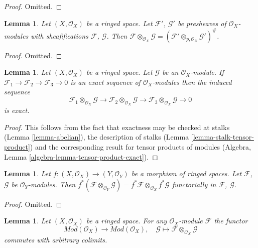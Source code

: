 \documentclass{stacks-project}
\theoremstyle{plain}
\newtheorem{lemma}[subsection]{Lemma}
\theoremstyle{definition}
\theoremstyle{remark}
\numberwithin{equation}{subsection}
\begin{document}
\begin{proof}
Omitted.
\end{proof}

\begin{lemma}
\label{lemma-tensor-product-sheafification}
Let $(X, \mathcal{O}_X)$ be a ringed space.
Let $\mathcal{F}'$, $\mathcal{G}'$ be presheaves of $\mathcal{O}_X$-modules
with sheafifications $\mathcal{F}$, $\mathcal{G}$. Then
$\mathcal{F} \otimes_{\mathcal{O}_X} \mathcal{G} =
(\mathcal{F}' \otimes_{p, \mathcal{O}_X} \mathcal{G}')^\#$.
\end{lemma}

\begin{proof}
Omitted.
\end{proof}


\begin{lemma}
\label{lemma-tensor-product-exact}
Let $(X, \mathcal{O}_X)$ be a ringed space.
Let $\mathcal{G}$ be an $\mathcal{O}_X$-module.
If
$\mathcal{F}_1
\to \mathcal{F}_2
\to \mathcal{F}_3
\to 0$
is an exact sequence of $\mathcal{O}_X$-modules then
the induced sequence
$$
\mathcal{F}_1 \otimes_{\mathcal{O}_X} \mathcal{G} \to
\mathcal{F}_2 \otimes_{\mathcal{O}_X} \mathcal{G} \to
\mathcal{F}_3 \otimes_{\mathcal{O}_X} \mathcal{G} \to
0
$$
is exact.
\end{lemma}

\begin{proof}
This follows from the fact that exactness may be checked at stalks
(Lemma \ref{lemma-abelian}), the description of stalks
(Lemma \ref{lemma-stalk-tensor-product}) and the corresponding
result for tensor products of modules
(Algebra, Lemma \ref{algebra-lemma-tensor-product-exact}).
\end{proof}

\begin{lemma}
\label{lemma-tensor-product-pullback}
Let $f : (X, \mathcal{O}_X) \to (Y, \mathcal{O}_Y)$ be
a morphism of ringed spaces. Let $\mathcal{F}$, $\mathcal{G}$
be $\mathcal{O}_Y$-modules. Then
$f^*(\mathcal{F} \otimes_{\mathcal{O}_Y} \mathcal{G})
= f^*\mathcal{F} \otimes_{\mathcal{O}_X} f^*\mathcal{G}$
functorially in $\mathcal{F}$, $\mathcal{G}$.
\end{lemma}

\begin{proof}
Omitted.
\end{proof}

\begin{lemma}
\label{lemma-tensor-commute-colimits}
Let $(X, \mathcal{O}_X)$ be a ringed space.
For any $\mathcal{O}_X$-module $\mathcal{F}$ the functor
$$
\textit{Mod}(\mathcal{O}_X) \longrightarrow \textit{Mod}(\mathcal{O}_X)
, \quad
\mathcal{G} \longmapsto \mathcal{F} \otimes_{\mathcal{O}_X} \mathcal{G}
$$
commutes with arbitrary colimits.
\end{lemma}
\end{document}
